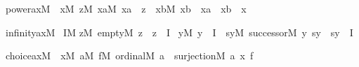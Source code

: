 \begin{isabelle}%
power{\isacharunderscore}{\kern0pt}ax{\isacharparenleft}{\kern0pt}M{\isacharparenright}{\kern0pt}\ {\isasymequiv}\ {\isasymforall}x{\isacharbrackleft}{\kern0pt}M{\isacharbrackright}{\kern0pt}{\isachardot}{\kern0pt}\ {\isasymexists}z{\isacharbrackleft}{\kern0pt}M{\isacharbrackright}{\kern0pt}{\isachardot}{\kern0pt}\ {\isasymforall}xa{\isacharbrackleft}{\kern0pt}M{\isacharbrackright}{\kern0pt}{\isachardot}{\kern0pt}\ xa\ {\isasymin}\ z\ {\isasymlongleftrightarrow}\ {\isacharparenleft}{\kern0pt}{\isasymforall}xb{\isacharbrackleft}{\kern0pt}M{\isacharbrackright}{\kern0pt}{\isachardot}{\kern0pt}\ xb\ {\isasymin}\ xa\ {\isasymlongrightarrow}\ xb\ {\isasymin}\ x{\isacharparenright}{\kern0pt}%
\end{isabelle}%
\begin{isabelle}%
infinity{\isacharunderscore}{\kern0pt}ax{\isacharparenleft}{\kern0pt}M{\isacharparenright}{\kern0pt}\ {\isasymequiv}\isanewline
{\isasymexists}I{\isacharbrackleft}{\kern0pt}M{\isacharbrackright}{\kern0pt}{\isachardot}{\kern0pt}\isanewline
\isaindent{\ \ \ }{\isacharparenleft}{\kern0pt}{\isasymexists}z{\isacharbrackleft}{\kern0pt}M{\isacharbrackright}{\kern0pt}{\isachardot}{\kern0pt}\ empty{\isacharparenleft}{\kern0pt}M{\isacharcomma}{\kern0pt}\ z{\isacharparenright}{\kern0pt}\ {\isasymand}\ z\ {\isasymin}\ I{\isacharparenright}{\kern0pt}\ {\isasymand}\isanewline
\isaindent{\ \ \ }{\isacharparenleft}{\kern0pt}{\isasymforall}y{\isacharbrackleft}{\kern0pt}M{\isacharbrackright}{\kern0pt}{\isachardot}{\kern0pt}\ y\ {\isasymin}\ I\ {\isasymlongrightarrow}\ {\isacharparenleft}{\kern0pt}{\isasymexists}sy{\isacharbrackleft}{\kern0pt}M{\isacharbrackright}{\kern0pt}{\isachardot}{\kern0pt}\ successor{\isacharparenleft}{\kern0pt}M{\isacharcomma}{\kern0pt}\ y{\isacharcomma}{\kern0pt}\ sy{\isacharparenright}{\kern0pt}\ {\isasymand}\ sy\ {\isasymin}\ I{\isacharparenright}{\kern0pt}{\isacharparenright}{\kern0pt}%
\end{isabelle}%
\begin{isabelle}%
choice{\isacharunderscore}{\kern0pt}ax{\isacharparenleft}{\kern0pt}M{\isacharparenright}{\kern0pt}\ {\isasymequiv}\ {\isasymforall}x{\isacharbrackleft}{\kern0pt}M{\isacharbrackright}{\kern0pt}{\isachardot}{\kern0pt}\ {\isasymexists}a{\isacharbrackleft}{\kern0pt}M{\isacharbrackright}{\kern0pt}{\isachardot}{\kern0pt}\ {\isasymexists}f{\isacharbrackleft}{\kern0pt}M{\isacharbrackright}{\kern0pt}{\isachardot}{\kern0pt}\ ordinal{\isacharparenleft}{\kern0pt}M{\isacharcomma}{\kern0pt}\ a{\isacharparenright}{\kern0pt}\ {\isasymand}\ surjection{\isacharparenleft}{\kern0pt}M{\isacharcomma}{\kern0pt}\ a{\isacharcomma}{\kern0pt}\ x{\isacharcomma}{\kern0pt}\ f{\isacharparenright}{\kern0pt}%
\end{isabelle}%
